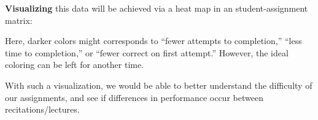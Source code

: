 \documentclass{techbrief}
\begin{document}
\begin{xframe}
    \textbf{Visualizing} this data will be achieved via a heat map in an
    student-assignment matrix:
    \begin{center}
    \end{center}
    Here, darker colors might corresponds to ``fewer attempts to completion,''
    ``less time to completion,'' or ``fewer correct on first attempt.''
    However,
    the ideal coloring can be left for another time.

    With such a visualization, we would be able to better understand the
    difficulty of our assignments, and see if differences in performance occur
    between recitations/lectures.
\end{xframe}
\end{document}
